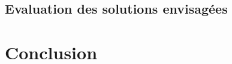\documentclass{article}
\begin{document}



\subsection{Evaluation des solutions envisagées}

\newpage




\section{Conclusion}

\newpage





\end{document}
